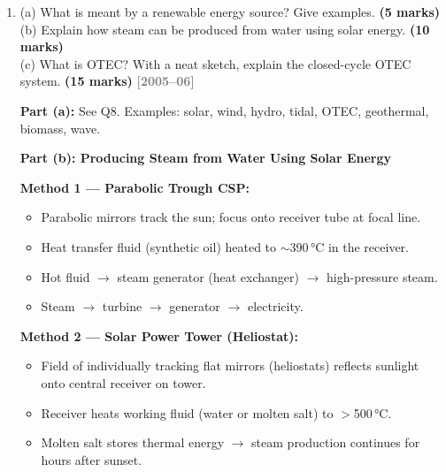 \documentclass[12pt,a3paper]{article}
\newcommand{\yr}[1]{\hfill\textcolor{gray}{\small\textbf{[#1]}}}
\newcommand{\mk}[1]{\textcolor{orange!70!black}{\small\textbf{(#1 marks)}}}
\begin{document}
\begin{enumerate}
\begin{tcolorbox}[enhanced,breakable,ansbox,colback=cA!4,colframe=cA,
  boxrule=0.8pt,arc=5pt,
  title={\textbf{Answer}},fonttitle=\bfseries\color{white},colbacktitle=cA]
\emph{Key fact:} 30 days of sunshine on Earth contains the energy equivalent of all fossil fuel reserves ever used and remaining.

\end{tcolorbox}

\item \label{qlabel:A1-Q17}
(a) What is meant by a renewable energy source? Give examples. \mk{5}\\
(b) Explain how steam can be produced from water using solar energy. \mk{10}\\
(c) What is OTEC? With a neat sketch, explain the closed-cycle OTEC system. \mk{15}
\yr{2005--06}

\begin{tcolorbox}[enhanced,breakable,ansbox,colback=cA!4,colframe=cA,
  boxrule=0.8pt,arc=5pt,
  title={\textbf{Answer}},fonttitle=\bfseries\color{white},colbacktitle=cA]

\textbf{Part (a):} See Q8. Examples: solar, wind, hydro, tidal, OTEC, geothermal, biomass, wave.

\hrulefill

\textbf{Part (b): Producing Steam from Water Using Solar Energy}

\textbf{Method 1 — Parabolic Trough CSP:}
\begin{itemize}[leftmargin=1.5em,itemsep=1pt]
  \item Parabolic mirrors track the sun; focus onto receiver tube at focal line.
  \item Heat transfer fluid (synthetic oil) heated to $\sim$390\,°C in the receiver.
  \item Hot fluid $\to$ steam generator (heat exchanger) $\to$ high-pressure steam.
  \item Steam $\to$ turbine $\to$ generator $\to$ electricity.
\end{itemize}

\textbf{Method 2 — Solar Power Tower (Heliostat):}
\begin{itemize}[leftmargin=1.5em,itemsep=1pt]
  \item Field of individually tracking flat mirrors (heliostats) reflects sunlight onto central receiver on tower.
  \item Receiver heats working fluid (water or molten salt) to $>$500\,°C.
  \item Molten salt stores thermal energy $\to$ steam production continues for hours after sunset.
\end{itemize}


\end{tcolorbox}
\end{enumerate}
\end{document}

